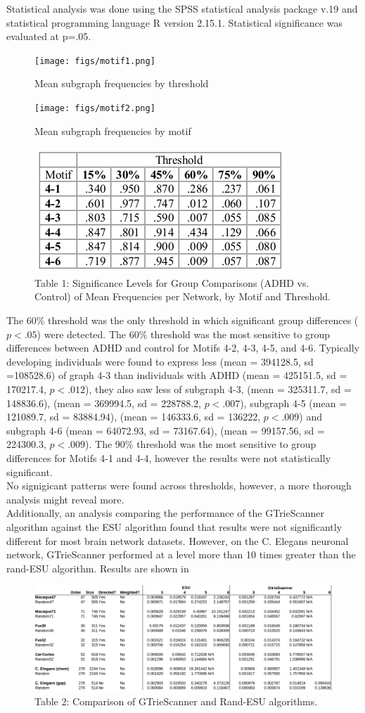 Statistical analysis was done using the SPSS statistical analysis package v.19 and statistical programming language R version 2.15.1. Statistical significance was evaluated at p=.05. 
\begin{figure}
\texttt{[image: figs/motif1.png]}
\caption{Mean subgraph frequencies by threshold}
\end{figure}

\begin{figure}
\texttt{[image: figs/motif2.png]}
\caption{Mean subgraph frequencies by motif}
\end{figure}

\begin{figure}
\caption*{Table 1: Significance Levels for Group Comparisons (ADHD vs. Control) of Mean Frequencies per Network, by Motif and Threshold.}
\begin{center}
\includegraphics{figs/table1.png}
\end{center}
\end{figure}
The 60\% threshold was the only threshold in which significant group differences ($p < .05$) were detected. The 60\% threshold was the most sensitive to group differences between ADHD and control for Motifs 4-2, 4-3, 4-5, and 4-6. Typically developing individuals were found to express less (mean = 394128.5, sd =108528.6) of graph 4-3 than individuals with ADHD (mean = 425151.5, sd = 170217.4, $p < .012$), they also saw less of subgraph 4-3, (mean = 325311.7, sd = 148836.6), (mean = 369994.5, sd = 228788.2, $p < .007$), subgraph 4-5 (mean = 121089.7, sd = 83884.94), (mean = 146333.6, sd = 136222, $p < .009$) and subgraph 4-6 (mean = 64072.93, sd = 73167.64), (mean = 99157.56, sd = 224300.3, $p < .009$). The 90\% threshold was the most sensitive to group differences for Motifs 4-1 and 4-4, however the results were not statistically significant.\\
No signigicant patterns were found across thresholds, however, a more thorough analysis might reveal more.\\
Additionally, an analysis comparing the performance of the GTrieScanner algorithm against the ESU algorithm found that results were not significantly different for most brain network datasets. However, on the C. Elegans neuronal network, GTrieScanner performed at a level more than 10 times greater than the rand-ESU algorithm. Results are shown in 
\begin{figure}
\caption*{Table 2: Comparison of GTrieScanner and Rand-ESU algorithms.}
\includegraphics{figs/gtries-esu.png}
\end{figure}